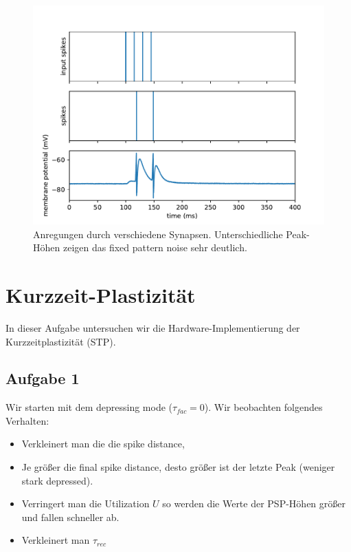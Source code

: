 \documentclass[10pt,a4paper]{scrartcl}
\begin{document}
\begin{figure} [ht]
\begin{center}
\label{fig:abb10}
\caption{Anregungen durch verschiedene Synapsen. Unterschiedliche Peak-Höhen zeigen das fixed pattern noise sehr deutlich.}
\includegraphics[scale=0.5]{pictures/resonant_firing.pdf} 
\end{center}
\end{figure}


\newpage


\section{Kurzzeit-Plastizität}
In dieser Aufgabe untersuchen wir die Hardware-Implementierung der Kurzzeitplastizität (STP). 

\subsection{Aufgabe 1}
Wir starten mit dem depressing mode ($\tau_{fac} = 0$). Wir beobachten folgendes Verhalten:
\begin{itemize}
\item Verkleinert man die die spike distance, 
\item Je größer die final spike distance, desto größer ist der letzte Peak (weniger stark depressed).
\item Verringert man die Utilization $U$ so werden die Werte der PSP-Höhen größer und fallen schneller ab.
\item Verkleinert man $\tau_{rec}$
\end{itemize} 
\end{document}

